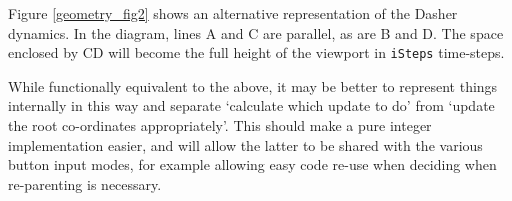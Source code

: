 \documentclass{article}
\begin{document}
Figure \ref{geometry_fig2} shows an alternative representation of the Dasher dynamics. In the diagram, lines A and C are parallel, as are B and D. The space enclosed by CD will become the full height of the viewport in {\tt iSteps} time-steps.

While functionally equivalent to the above, it may be better to represent things internally in this way and separate `calculate which update to do' from `update the root co-ordinates appropriately'. This should make a pure integer implementation easier, and will allow the latter to be shared with the various button input modes, for example allowing easy code re-use when deciding when re-parenting is necessary.
\end{document}
